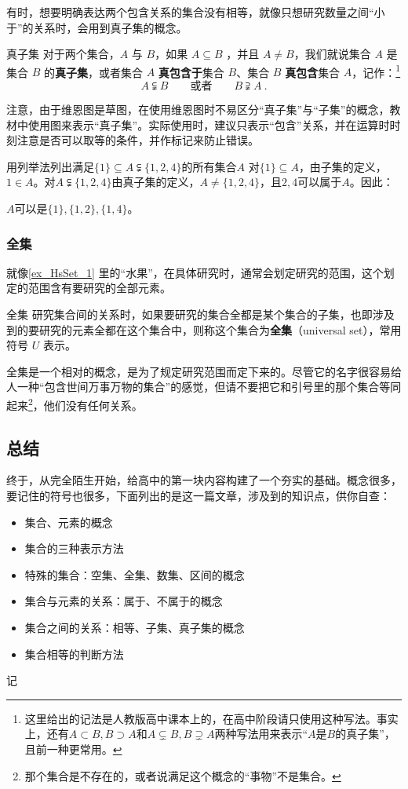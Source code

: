 有时，想要明确表达两个包含关系的集合没有相等，就像只想研究数量之间“小于”的关系时，会用到真子集的概念。

\begin{definition}{真子集}
对于两个集合，$A$ 与 $B$，如果 $A\subseteq B$ ，并且 $A \ne B$，我们就说集合 $A$ 是集合 $B$ 的\textbf{真子集}，或者集合 $A$ \textbf{真包含于}集合 $B$、集合 $B$ \textbf{真包含}集合 $A$，记作：\footnote{这里给出的记法是人教版高中课本上的，在高中阶段请只使用这种写法。事实上，还有$A\subset B,B\supset A$和$A\subsetneq B,B\supsetneq A$两种写法用来表示“$A$是$B$的真子集”，且前一种更常用。}
\begin{equation}
A \subsetneqq B\qquad\text{或者}\qquad B \supsetneqq A~.
\end{equation}
\end{definition}

注意，由于维恩图是草图，在使用维恩图时不易区分“真子集”与“子集”的概念，教材中使用图来表示“真子集”。实际使用时，建议只表示“包含”关系，并在运算时时刻注意是否可以取等的条件，并作标记来防止错误。

\begin{exercise}{用列举法列出满足$\{1\}\subseteq A\subsetneqq\{1,2,4\}$的所有集合$A$}
对$\{1\}\subseteq A$，由子集的定义，$1\in A$。对$A\subsetneqq\{1,2,4\}$由真子集的定义，$A\neq \{1,2,4\}$，且$2,4$可以属于$A$。因此：

$A$可以是$\{1\},\{1,2\},\{1,4\}$。
\end{exercise}
\subsubsection{全集}

就像\autoref{ex_HsSet_1} 里的“水果”，在具体研究时，通常会划定研究的范围，这个划定的范围含有要研究的全部元素。

\begin{definition}{全集}\label{def_HsSet_1}
研究集合间的关系时，如果要研究的集合全都是某个集合的子集，也即涉及到的要研究的元素全都在这个集合中，则称这个集合为\textbf{全集}（universal set），常用符号 $U$ 表示。
\end{definition}


全集是一个相对的概念，是为了规定研究范围而定下来的。尽管它的名字很容易给人一种“包含世间万事万物的集合”的感觉，但请不要把它和引号里的那个集合等同起来\footnote{那个集合是不存在的，或者说满足这个概念的“事物”不是集合。}，他们没有任何关系。


\subsection{总结}

终于，从完全陌生开始，给高中的第一块内容构建了一个夯实的基础。概念很多，要记住的符号也很多，下面列出的是这一篇文章，涉及到的知识点，供你自查：

\begin{itemize}
\item 集合、元素的概念
\item 集合的三种表示方法
\item 特殊的集合：空集、全集、数集、区间的概念
\item 集合与元素的关系：属于、不属于的概念
\item 集合之间的关系：相等、子集、真子集的概念
\item 集合相等的判断方法
\end{itemize}



记
